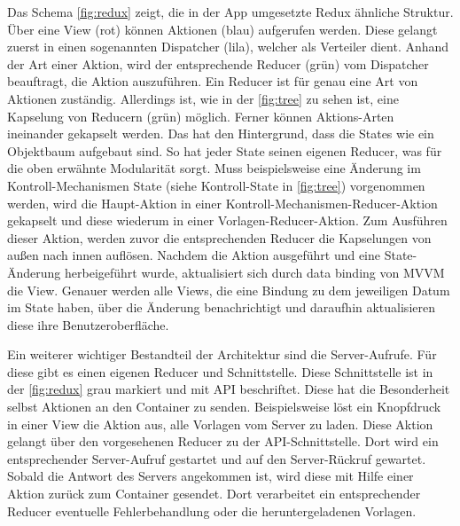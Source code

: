 \documentclass[notables, nomenclature, oneside, 150]{HSMW-Thesis}
\begin{document}
		Das Schema \ref{fig:redux} zeigt, die in der App umgesetzte Redux ähnliche Struktur. Über eine View (rot) können Aktionen (blau) aufgerufen werden. Diese gelangt zuerst in einen sogenannten Dispatcher (lila), welcher als Verteiler dient. Anhand der Art einer Aktion, wird der entsprechende Reducer (grün) vom Dispatcher beauftragt, die Aktion auszuführen. Ein Reducer ist für genau eine Art von Aktionen zuständig. Allerdings ist, wie in der \autoref{fig:tree} zu sehen ist, eine Kapselung von Reducern (grün) möglich. Ferner können Aktions-Arten ineinander gekapselt werden. Das hat den Hintergrund, dass die States wie ein Objektbaum aufgebaut sind. So hat jeder State seinen eigenen Reducer, was für die oben erwähnte Modularität sorgt. Muss beispielsweise eine Änderung im Kontroll-Mechanismen State (siehe Kontroll-State in \ref{fig:tree}) vorgenommen werden, wird die Haupt-Aktion in einer Kontroll-Mechanismen-Reducer-Aktion gekapselt und diese wiederum in einer Vorlagen-Reducer-Aktion. Zum Ausführen dieser Aktion, werden zuvor die entsprechenden Reducer die Kapselungen von außen nach innen auflösen. Nachdem die Aktion ausgeführt und eine State-Änderung herbeigeführt wurde, aktualisiert sich durch data binding von MVVM die View. Genauer werden alle Views, die eine Bindung zu dem jeweiligen Datum im State haben, über die Änderung benachrichtigt und daraufhin aktualisieren diese ihre Benutzeroberfläche.

		Ein weiterer wichtiger Bestandteil der Architektur sind die Server-Aufrufe. Für diese gibt es einen eigenen Reducer und Schnittstelle. Diese Schnittstelle ist in der \autoref{fig:redux} grau markiert und mit API  beschriftet. Diese hat die Besonderheit selbst Aktionen an den Container zu senden. Beispielsweise löst ein Knopfdruck in einer View die Aktion aus, alle Vorlagen vom Server zu laden. Diese Aktion gelangt über den vorgesehenen Reducer zu der API-Schnittstelle. Dort wird ein entsprechender Server-Aufruf gestartet und auf den Server-Rückruf gewartet. Sobald die Antwort des Servers angekommen ist, wird diese mit Hilfe einer Aktion zurück zum Container gesendet. Dort verarbeitet ein entsprechender Reducer eventuelle Fehlerbehandlung oder die heruntergeladenen Vorlagen.
		
\end{document}
